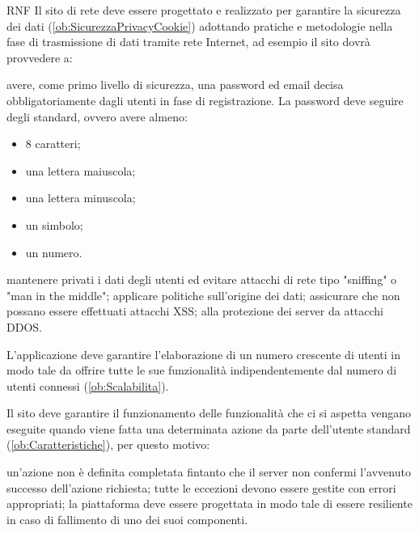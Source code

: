 \begin{listaPersonale}{RNF}
       Il sito di rete deve essere progettato e realizzato per garantire la sicurezza dei dati (\ref{ob:SicurezzaPrivacyCookie}) adottando pratiche e metodologie nella fase di trasmissione di dati tramite rete Internet, ad esempio il sito dovrà provvedere a:
      \begin{listaPersonale2}[RNF]{}
             avere, come primo livello di sicurezza, una password ed email decisa obbligatoriamente dagli utenti in fase di registrazione. La password deve seguire degli standard, ovvero avere almeno:
            \begin{itemize}
                  \item 8 caratteri;
                  \item una lettera maiuscola;
                  \item una lettera minuscola;
                  \item un simbolo;
                  \item un numero.
            \end{itemize}
             mantenere privati i dati degli utenti ed evitare attacchi di rete tipo "sniffing" o "man in the middle";
             applicare politiche sull'origine dei dati;
             assicurare che non possano essere effettuati attacchi XSS;
             alla protezione dei server da attacchi DDOS.
      \end{listaPersonale2}

       L'applicazione deve garantire l'elaborazione di un numero crescente di utenti in modo tale da offrire tutte le sue funzionalità indipendentemente dal numero di utenti connessi (\ref{ob:Scalabilita}).

       Il sito deve garantire il funzionamento delle funzionalità che ci si aspetta vengano eseguite quando viene fatta una determinata azione da parte dell'utente standard (\ref{ob:Caratteristiche}), per questo motivo:
      \begin{listaPersonale2}[RNF]{}
             un'azione non è definita completata fintanto che il server non confermi l'avvenuto successo dell'azione richiesta;
             tutte le eccezioni devono essere gestite con errori appropriati;
             la piattaforma deve essere progettata in modo tale di essere resiliente in caso di fallimento di uno dei suoi componenti.
      \end{listaPersonale2}


\end{listaPersonale}
